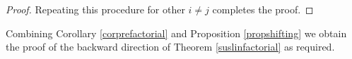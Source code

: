 \documentclass[12pt]{report}
\numberwithin{equation}{section}
\newcounter{dummy} \numberwithin{dummy}{section}
\newtheorem{definition}[dummy]{Definition}
\newtheorem{proposition}[dummy]{Proposition}
\begin{document}
\begin{proof}
		Repeating this procedure for other $i \neq j $ completes the proof.	
  \end{proof}
	
	
	Combining Corollary \ref{corprefactorial} and Proposition \ref{propshifting} we obtain the proof of the backward direction of Theorem \ref{suslinfactorial} as required.
	
%	
%	
%	
%	
%	
\end{document}
